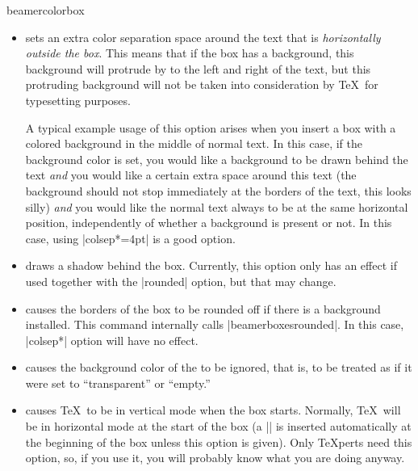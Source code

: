 \begin{environment}{{beamercolorbox}}
\begin{itemize}
  \item
     sets an extra color separation space around the text that is \emph{horizontally outside the box}. This means that if the box has a background, this background will protrude by  to the left and right of the text, but this protruding background will not be taken into consideration by \TeX\ for typesetting purposes.

    A typical example usage of this option arises when you insert a box with a colored background in the middle of normal text. In this case, if the background color is set, you would like a background to be drawn behind the text \emph{and} you would like a certain extra space around this text (the background should not stop immediately at the borders of the text, this looks silly) \emph{and} you would like the normal text always to be at the same horizontal position, independently of whether a background is present or not. In this case, using |colsep*=4pt| is a good option.
  \item
     draws a shadow behind the box. Currently, this option only has an effect if used together with the |rounded| option, but that may change.
  \item
     causes the borders of the box to be rounded off if there is a background installed. This command internally calls |beamerboxesrounded|. In this case, |colsep*| option will have no effect.
  \item
     causes the background color of the  to be ignored, that is, to be treated as if it were set to ``transparent'' or ``empty.''
  \item
     causes \TeX\ to be in vertical mode when the box starts. Normally, \TeX\ will be in horizontal mode at the start of the box (a |\leavevmode| is inserted automatically at the beginning of the box unless this option is given). Only \TeX perts need this option, so, if you use it, you will probably know what you are doing anyway.
  \end{itemize}
\end{environment}

